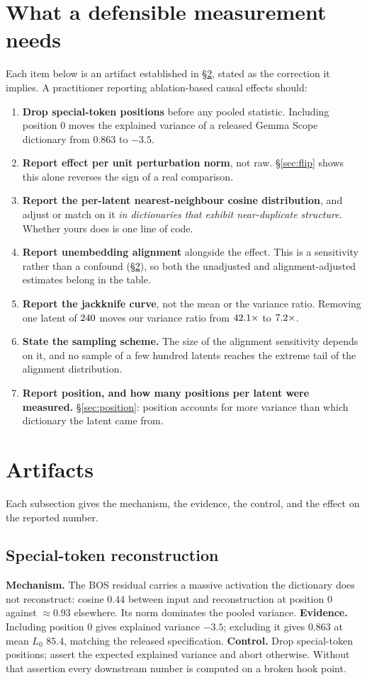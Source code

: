 \documentclass[11pt]{article}
\begin{document}
\section{What a defensible measurement needs}
\label{sec:protocol}
Each item below is an artifact established in \S\ref{sec:artifacts}, stated as
the correction it implies. A practitioner reporting ablation-based causal effects
should:
\begin{enumerate}
\item \textbf{Drop special-token positions} before any pooled statistic.
Including position $0$ moves the explained variance of a released Gemma Scope
dictionary from $0.863$ to $-3.5$.
\item \textbf{Report effect per unit perturbation norm}, not raw. \S\ref{sec:flip}
shows this alone reverses the sign of a real comparison.
\item \textbf{Report the per-latent nearest-neighbour cosine distribution}, and
adjust or match on it \emph{in dictionaries that exhibit near-duplicate
structure}. Whether yours does is one line of code.
\item \textbf{Report unembedding alignment} alongside the effect. This is a
sensitivity rather than a confound (\S\ref{sec:artifacts}), so both the
unadjusted and alignment-adjusted estimates belong in the table.
\item \textbf{Report the jackknife curve}, not the mean or the variance ratio.
Removing one latent of $240$ moves our variance ratio from
$42.1\times$ to $7.2\times$.
\item \textbf{State the sampling scheme.} The size of the alignment sensitivity
depends on it, and no sample of a few hundred latents reaches the extreme tail of
the alignment distribution.
\item \textbf{Report position, and how many positions per latent were measured.}
\S\ref{sec:position}: position accounts for more variance than which dictionary
the latent came from.
\end{enumerate}

\section{Artifacts}
\label{sec:artifacts}

Each subsection gives the mechanism, the evidence, the control, and the effect on
the reported number.

\subsection{Special-token reconstruction}
\textbf{Mechanism.} The BOS residual carries a massive activation the dictionary
does not reconstruct: cosine $0.44$ between input and reconstruction at position
$0$ against $\approx\!0.93$ elsewhere. Its norm dominates the pooled variance.
\textbf{Evidence.} Including position $0$ gives explained variance $-3.5$;
excluding it gives $0.863$ at mean $L_0$ $85.4$, matching the released
specification. \textbf{Control.} Drop special-token positions; assert the
expected explained variance and abort otherwise. Without that assertion every
downstream number is computed on a broken hook point.
\end{document}
